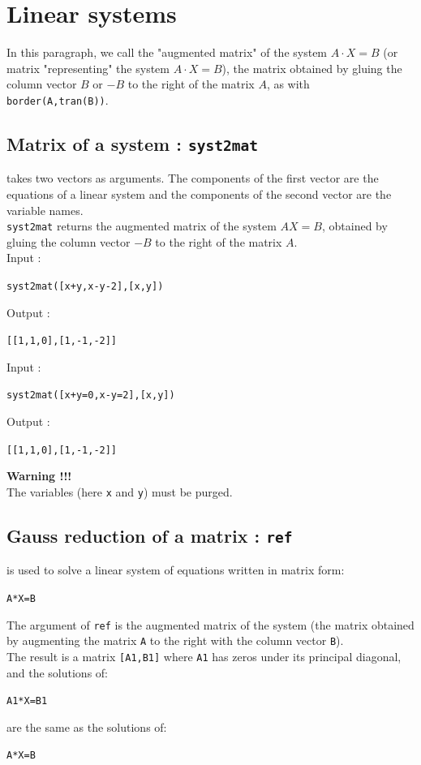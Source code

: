 \documentclass[a4paper,11pt]{book}
\begin{document}
\section{Linear systems}
In this paragraph, we call the "augmented matrix" of the system
$A \cdot X=B$ (or matrix "representing" the system $A \cdot X=B$),
the matrix obtained by gluing the column vector $B$ or $-B$
to the right of the matrix $A$, as with {\tt border(A,tran(B))}.
   
\subsection{Matrix of a system : {\tt syst2mat}}
 takes two vectors as arguments. The components of the 
first vector are the equations of a linear system and the components of the
second vector are the variable names.\\
{\tt syst2mat} returns the augmented matrix of the system $AX=B$,
obtained by gluing the column vector $-B$
to the right of the matrix $A$.\\
Input :
\begin{center}{\tt syst2mat([x+y,x-y-2],[x,y])}\end{center}
Output :
\begin{center}{\tt [[1,1,0],[1,-1,-2]]}\end{center}
Input :
\begin{center}{\tt syst2mat([x+y=0,x-y=2],[x,y])}\end{center}
Output :
\begin{center}{\tt [[1,1,0],[1,-1,-2]]}\end{center}
{\bf Warning !!!}\\
The variables (here {\tt x} and {\tt y}) must be purged.

\subsection{Gauss reduction of a matrix : {\tt ref}}\label{ref} \label{sec:ref}
 is used to solve a linear system of equations written in
matrix form:
 \begin{center}{\tt A*X=B}\end{center}
The argument of {\tt ref} is the augmented matrix of the system
(the matrix obtained by augmenting the matrix {\tt A} to the right with
the column vector {\tt B}).\\
The result is a matrix {\tt [A1,B1]} where {\tt A1} has zeros
under its principal diagonal, and the solutions of:
\begin{center}{\tt A1*X=B1}\end{center} 
are the same as the solutions of:
\begin{center}{\tt A*X=B}\end{center}
\end{document}
